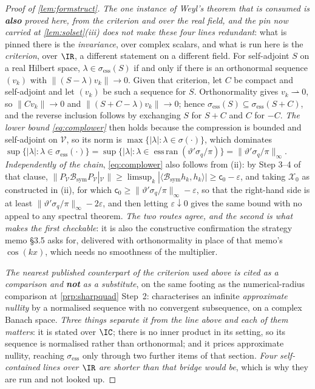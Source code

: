 \begin{proof}[Proof of \cref{lem:formstruct}]
\emph{The one instance of Weyl's theorem that is consumed is \textbf{also} proved here, from the
criterion and over the real field, and the pin now carried at \cref{lem:solset}\textup{(iii)} does not
make these four lines redundant}: what is pinned there is the \emph{invariance}, over complex scalars,
and what is run here is the \emph{criterion}, over $\IR$, a different statement on a different field.
For self-adjoint $S$ on a real Hilbert space,
$\lambda\in\sigma_{\mathrm{ess}}(S)$ if and only if there is an orthonormal sequence $(v_k)$ with
$\|(S-\lambda)v_k\|\to0$. Given that criterion, let $C$ be compact and self-adjoint and let $(v_k)$ be
such a sequence for $S$. Orthonormality gives $v_k\rightharpoonup0$, so $\|Cv_k\|\to0$ and
$\|(S+C-\lambda)v_k\|\to0$; hence $\sigma_{\mathrm{ess}}(S)\subseteq\sigma_{\mathrm{ess}}(S+C)$, and the
reverse inclusion follows by exchanging $S$ for $S+C$ and $C$ for $-C$. \emph{The lower bound
\eqref{eq:complower}} then holds because the compression is bounded and self-adjoint on $\mathcal V$, so
its norm is $\max\{|\lambda|:\lambda\in\sigma(\cdot)\}$, which dominates
$\sup\{|\lambda|:\lambda\in\sigma_{\mathrm{ess}}(\cdot)\}
=\sup\{|\lambda|:\lambda\in\operatorname{ess\,ran}(\vartheta'\sigma_q/\pi)\}
=\|\vartheta'\sigma_q/\pi\|_\infty$.
\emph{Independently of the chain}, \eqref{eq:complower} also follows from (ii): by Step 3--4 of that
clause, $\|P_{\mathcal V}\mathcal B_{\mathrm{sym}}P_{\mathcal V}|_{\mathcal V}\|
\ge\limsup_k|\langle\mathcal B_{\mathrm{sym}}h_k,h_k\rangle|\ge\mathsf c_0-\varepsilon$, and taking
$\mathcal X_0$ as constructed in (ii), for which
$\mathsf c_0\ge\|\vartheta'\sigma_q/\pi\|_\infty-\varepsilon$, so that the right-hand side is at least
$\|\vartheta'\sigma_q/\pi\|_\infty-2\varepsilon$, and then letting $\varepsilon\downarrow0$ gives the
same bound with no appeal to any spectral theorem. \emph{The two routes agree, and the second is what makes the
first checkable}: it is also the constructive confirmation the strategy memo \S3.5 asks for, delivered
with orthonormality in place of that memo's $\cos(kx)$, which needs no smoothness of the multiplier.

\emph{The nearest published counterpart of the criterion used above is cited as a comparison and
\textbf{not} as a substitute}, on the same footing as the numerical-radius comparison at
\cref{prp:sharpquad} Step~2: \citet[Thm.~IV.5.11]{kato1995} characterises an infinite \emph{approximate
nullity} by a normalised sequence with no convergent subsequence, on a complex Banach space. \emph{Three
things separate it from the line above and each of them matters}: it is stated over $\IC$; there is no
inner product in its setting, so its sequence is normalised rather than orthonormal; and it prices
approximate nullity, reaching $\sigma_{\mathrm{ess}}$ only through two further items of that section.
\emph{Four self-contained lines over $\IR$ are shorter than that bridge would be}, which is why they are
run and not looked up.


\end{proof}
